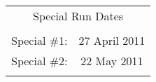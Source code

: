 \begin{table}[cc]
\begin{tabular}{||c c||}
        \multicolumn{2}{||c||}{\Large Special Run Dates} \\
        \vspace{\baselineskip} & \vspace{\baselineskip} \\
        Special \#1: & 27 April 2011 \\
        Special \#2: & 22 May 2011 \\
        \vspace{\baselineskip} & \vspace{\baselineskip} \\
        \hline \hline
    \end{tabular}
\end{table}
